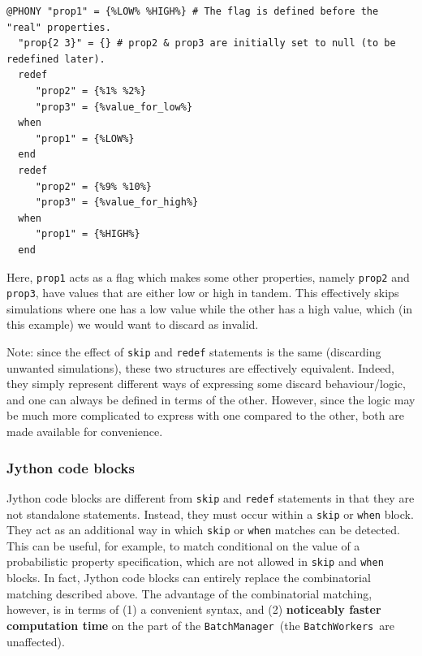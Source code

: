 \documentclass{article}
\newcommand{\BM}{{\tt BatchManager}}
\newcommand{\BWs}{{\tt BatchWorkers}}
\begin{document}
\begin{lstlisting}[]
  @PHONY "prop1" = {%LOW% %HIGH%} # The flag is defined before the "real" properties.
  "prop{2 3}" = {} # prop2 & prop3 are initially set to null (to be redefined later).
  redef
     "prop2" = {%1% %2%}
     "prop3" = {%value_for_low%}
  when
     "prop1" = {%LOW%}
  end
  redef
     "prop2" = {%9% %10%}
     "prop3" = {%value_for_high%}
  when
     "prop1" = {%HIGH%}
  end
\end{lstlisting}

Here, {\tt prop1} acts as a flag which makes some other properties, namely {\tt prop2} and {\tt prop3}, have values that are either low or high in tandem. This effectively skips simulations where one has a low value while the other has a high value, which (in this example) we would want to discard as invalid.

\begin{sideblock}
Note: since the effect of {\tt skip} and {\tt redef} statements is the same (discarding unwanted simulations), these two structures are effectively equivalent. Indeed, they simply represent different ways of expressing some discard behaviour/logic, and one can always be defined in terms of the other. However, since the logic may be much more complicated to express with one compared to the other, both are made available for convenience.
\end{sideblock}

\subsubsection{Jython code blocks}

Jython code blocks are different from {\tt skip} and {\tt redef} statements in that they are not standalone statements. Instead, they must occur within a {\tt skip} or {\tt when} block. They act as an additional way in which {\tt skip} or {\tt when} matches can be detected. This can be useful, for example, to match conditional on the value of a probabilistic property specification, which are not allowed in {\tt skip} and {\tt when} blocks. In fact, Jython code blocks can entirely replace the combinatorial matching described above. The advantage of the combinatorial matching, however, is in terms of (1) a convenient syntax, and (2) \textbf{noticeably faster computation time} on the part of the \BM\ (the \BWs\ are unaffected).
\end{document}
